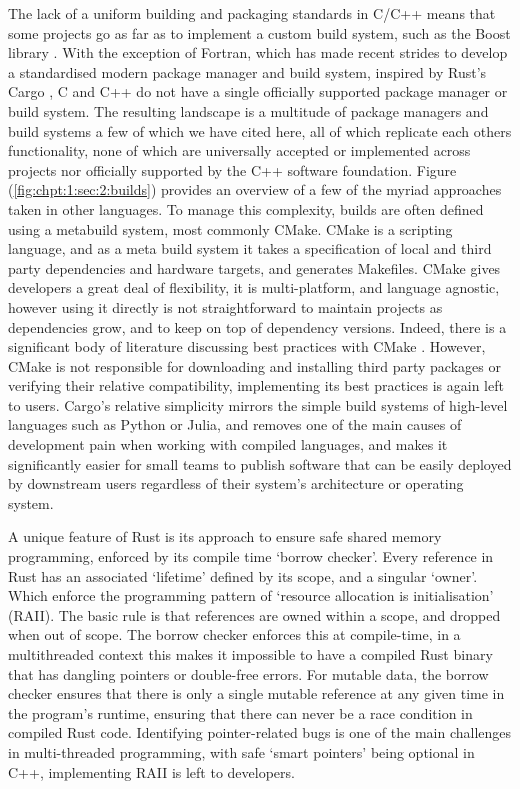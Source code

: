 The lack of a uniform building and packaging standards in C/C++ means that some projects go as far as to implement a custom build system, such as the Boost library \cite{boostbuild2022github}. With the exception of Fortran, which has made recent strides to develop a standardised modern package manager and build system, inspired by Rust's Cargo \cite{fpm2022github}, C and C++ do not have a single officially supported package manager or build system. The resulting landscape is a multitude of package managers \cite{spack2022github, vcpkg2022github, conan2022github} and build systems \cite{meson2022github, bazel2022github, scons2022github} a few of which we have cited here, all of which replicate each others functionality, none of which are universally accepted or implemented across projects nor officially supported by the C++ software foundation. Figure (\ref{fig:chpt:1:sec:2:builds}) provides an overview of a few of the myriad approaches taken in other languages. To manage this complexity, builds are often defined using a metabuild system, most commonly CMake. CMake is a scripting language, and as a meta build system it takes a specification of local and third party dependencies and hardware targets, and generates Makefiles. CMake gives developers a great deal of flexibility, it is multi-platform, and language agnostic, however using it directly is not straightforward to maintain projects as dependencies grow, and to keep on top of dependency versions. Indeed, there is a significant body of literature discussing best practices with CMake \cite{scott2018professional}. However, CMake is not responsible for downloading and installing third party packages or verifying their relative compatibility, implementing its best practices is again left to users. Cargo's relative simplicity mirrors the simple build systems of high-level languages such as Python or Julia, and removes one of the main causes of development pain when working with compiled languages, and makes it significantly easier for small teams to publish software that can be easily deployed by downstream users regardless of their system's architecture or operating system.

A unique feature of Rust is its approach to ensure safe shared memory programming, enforced by its compile time `borrow checker'. Every reference in Rust has an associated `lifetime' defined by its scope, and a singular `owner'. Which enforce the programming pattern of `resource allocation is initialisation' (RAII). The basic rule is that references are owned within a scope, and dropped when out of scope. The borrow checker enforces this at compile-time, in a multithreaded context this makes it impossible to have a compiled Rust binary that has dangling pointers or double-free errors. For mutable data, the borrow checker ensures that there is only a single mutable reference at any given time in the program's runtime, ensuring that there can never be a race condition in compiled Rust code. Identifying pointer-related bugs is one of the main challenges in multi-threaded programming, with safe `smart pointers' being optional in C++, implementing RAII is left to developers.

